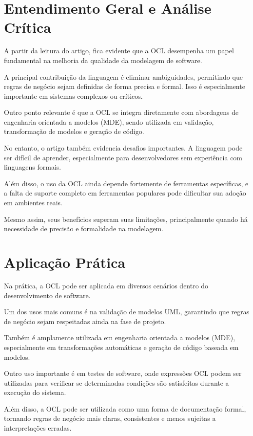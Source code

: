 \documentclass[conference]{IEEEtran}
\begin{document}
\section{Entendimento Geral e Análise Crítica}

A partir da leitura do artigo, fica evidente que a OCL desempenha um papel fundamental na melhoria da qualidade da modelagem de software.

A principal contribuição da linguagem é eliminar ambiguidades, permitindo que regras de negócio sejam definidas de forma precisa e formal. Isso é especialmente importante em sistemas complexos ou críticos.

Outro ponto relevante é que a OCL se integra diretamente com abordagens de engenharia orientada a modelos (MDE), sendo utilizada em validação, transformação de modelos e geração de código.

No entanto, o artigo também evidencia desafios importantes. A linguagem pode ser difícil de aprender, especialmente para desenvolvedores sem experiência com linguagens formais.

Além disso, o uso da OCL ainda depende fortemente de ferramentas específicas, e a falta de suporte completo em ferramentas populares pode dificultar sua adoção em ambientes reais.

Mesmo assim, seus benefícios superam suas limitações, principalmente quando há necessidade de precisão e formalidade na modelagem.

\section{Aplicação Prática}

Na prática, a OCL pode ser aplicada em diversos cenários dentro do desenvolvimento de software.

Um dos usos mais comuns é na validação de modelos UML, garantindo que regras de negócio sejam respeitadas ainda na fase de projeto.

Também é amplamente utilizada em engenharia orientada a modelos (MDE), especialmente em transformações automáticas e geração de código baseada em modelos.

Outro uso importante é em testes de software, onde expressões OCL podem ser utilizadas para verificar se determinadas condições são satisfeitas durante a execução do sistema.

Além disso, a OCL pode ser utilizada como uma forma de documentação formal, tornando regras de negócio mais claras, consistentes e menos sujeitas a interpretações erradas.
\end{document}
